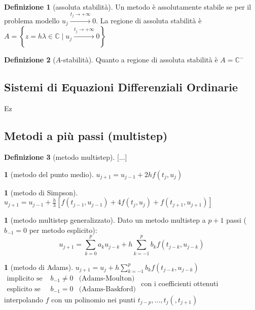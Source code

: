 \documentclass[a4paper,10pt]{article}
\theoremstyle{definition}
\theoremstyle{indentdefinition}
\newtheorem{defn}{Definizione}[section]
\theoremstyle{indenttheorem}
\theoremstyle{myremark}
\theoremstyle{indentgeneral}
\newtheorem{lyxalgorithm}[thm]{\protect\algorithmname}
\theoremstyle{plain}
\theoremstyle{plain}
\begin{document}
\begin{defn}[assoluta stabilità]
Un metodo è assolutamente stabile se per il problema modello $u_{j}\overset{t_{j}\rightarrow+\infty}{\longrightarrow}0$.
La regione di assoluta stabilità è $A=\left\{ z=h\lambda\in\mathbb{C}\mid u_{j}\overset{t_{j}\rightarrow+\infty}{\longrightarrow}0\right\} $
\end{defn}

\begin{defn}[$A$-stabilità]
Quanto a regione di assoluta stabilità è $A=\mathbb{C}^{-}$
\end{defn}


\subsection{Sistemi di Equazioni Differenziali Ordinarie}

Ez

\subsection{Metodi a più passi (multistep)}
\begin{defn}[metodo multistep]
\label{def:metodo-multistep}{[}...{]}
\end{defn}

\begin{lyxalgorithm}[metodo del punto medio]
\label{alg:metodo-punto-medio}$u_{j+1}=u_{j-1}+2hf\left(t_{j},u_{j}\right)$
\end{lyxalgorithm}

\begin{lyxalgorithm}[metodo di Simpson]
\label{alg:metodo-di-simpson}$u_{j+1}=u_{j-1}+\frac{h}{3}\left[f\left(t_{j-1},u_{j-1}\right)+4f\left(t_{j},u_{j}\right)+f\left(t_{j+1},u_{j+1}\right)\right]$
\end{lyxalgorithm}

\begin{lyxalgorithm}[metodo multistep generalizzato]
Dato un metodo multistep a $p+1$ passi ($b_{-1} = 0$ per metodo esplicito):
    \[
    u_{j+1} = \sum_{k=0}^p a_k u_{j-k} + h \sum_{k=-1}^p b_k f(t_{j-k},u_{j-k})
    \]
\end{lyxalgorithm}

\begin{lyxalgorithm}[metodo di Adams]
\label{alg:metodo-di-adams}$u_{j+1}=u_{j}+h\sum_{k=-1}^{p}b_{k}f\left(t_{j-k},u_{j-k}\right)$
$\begin{array}{lll}
\text{implicito se } & b_{-1}\neq0 & \text{(Adams-Moulton)}\\
\text{esplicito se } & b_{-1}=0 & \text{(Adams-Baskford)}
\end{array}$ con i coefficienti ottenuti interpolando $f$ con un polinomio nei
punti $t_{j-p},\ldots,t_{j}\left(,t_{j+1}\right)$
\end{lyxalgorithm}
\end{document}
